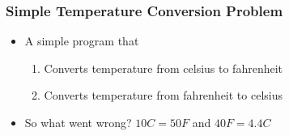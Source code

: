 \documentclass[10pt,t]{beamer}
\begin{document}

\begin{frame}[fragile]
  \frametitle{Simple Temperature Conversion Problem}
  \begin{itemize}
    \item A simple program that 
    \begin{enumerate}
      \item Converts temperature from celsius to fahrenheit
      \item Converts temperature from fahrenheit to celsius
    \end{enumerate}
      \begin{columns}[t]
        Fortran},basicstyle=\fontsize{6}{5}\selectfont\ttfamily]{./demo/simple.f90}
        \column{0.6\textwidth}
        \begin{lstlisting}[basicstyle=\fontsize{6}{5}\selectfont\ttfamily]
altair:Exercise apacheco$ gfortran simple.f90
altair:Exercise apacheco$ ./a.out 
 10C =    42.0000000     F
 40F =    0.00000000     C
        \end{lstlisting}
      \end{columns}
    \item So what went wrong? $10C = 50F$ and $40F = 4.4C$
  \end{itemize}
\end{frame}
\end{document}
